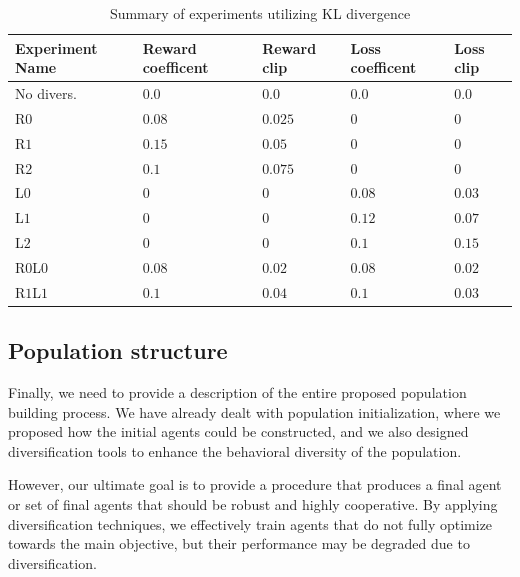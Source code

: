 \begin{table}[htbp]
    \small
    \centering
    \begin{tabular}{lllll}
      \toprule
      Experiment Name        & Reward coefficent     & Reward clip  & Loss coefficent  & Loss clip          \\ \midrule

      No divers.     & $0.0$     & $0.0$   & $0.0$     & $0.0$                        \\\midrule  
      R$0$     & $0.08$     & $0.025$   & $0$     & $0$                        \\
      R$1$     & $0.15$     & $0.05$   & $0$     & $0$                        \\
      R$2$     & $0.1$     & $0.075$   & $0$     & $0$                        \\\midrule
      L$0$     & $0$     & $0$   & $0.08$     & $0.03$                        \\
      L$1$     & $0$     & $0$   & $0.12$     & $0.07$                        \\      
      L$2$     & $0$     & $0$   & $0.1$     & $0.15$                        \\\midrule      
      R$0$L$0$     & $0.08$     & $0.02$   & $0.08$     & $0.02$                        \\
      R$1$L$1$     & $0.1$     & $0.04$   & $0.1$     & $0.03$                        \\
      
     \bottomrule
    \end{tabular}
    \caption{Summary of experiments utilizing KL divergence}
    \label{tab:KLDiv-coefiicents}
\end{table}


\subsection{Population structure}
Finally, we need to provide a description of the entire proposed population building process.
We have already dealt with population initialization, where we proposed how the initial agents could be constructed, and we also designed diversification tools to enhance the behavioral diversity of the population.

However, our ultimate goal is to provide a procedure that produces a final agent or set of final agents that should be robust and highly cooperative.
By applying diversification techniques, we effectively train agents that do not fully optimize towards the main objective, but their performance may be degraded due to diversification.

